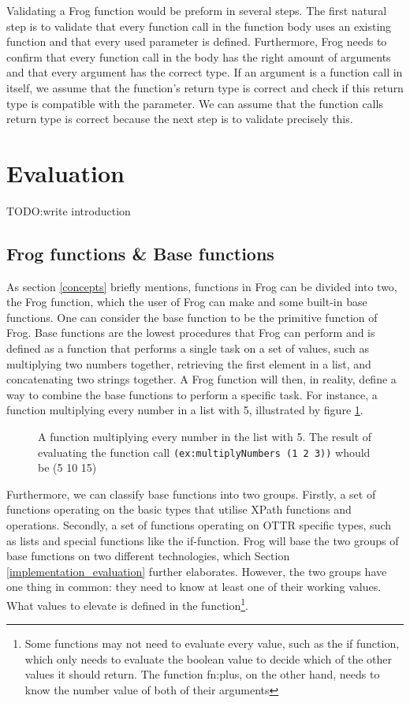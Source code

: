 \para
Validating a Frog function would be preform in several steps. The first natural step is to validate that every function call in the function body uses an existing function and that every used parameter is defined. Furthermore, Frog needs to confirm that every function call in the body has the right amount of arguments and that every argument has the correct type. If an argument is a function call in itself, we assume that the function's return type is correct and check if this return type is compatible with the parameter. We can assume that the function calls return type is correct because the next step is to validate precisely this. 

\section{Evaluation}
TODO:write introduction

\subsection{Frog functions \& Base functions}
As section \ref{concepts} briefly mentions, functions in Frog can be divided into two, the Frog function, which the user of Frog can make and some built-in base functions. One can consider the base function to be the primitive function of Frog. Base functions are the lowest procedures that Frog can perform and is defined as a function that performs a single task on a set of values, such as multiplying two numbers together, retrieving the first element in a list, and concatenating two strings together. A Frog function will then, in reality, define a way to combine the base functions to perform a specific task. For instance, a function multiplying every number in a list with 5, illustrated by figure \ref{fig:list_multiplication}. 

\begin{figure}
    
    \caption{A function multiplying every number in the list with 5. The result of evaluating the function call \lstinline{(ex:multiplyNumbers (1 2 3))} whould be (5 10 15)}
    \label{fig:list_multiplication}
\end{figure}


\para
Furthermore, we can classify base functions into two groups. Firstly, a set of functions operating on the basic types that utilise XPath functions and operations. Secondly, a set of functions operating on OTTR specific types, such as lists and special functions like the if-function. Frog will base the two groups of base functions on two different technologies, which Section \ref{implementation_evaluation} further elaborates. However, the two groups have one thing in common: they need to know at least one of their working values. What values to elevate is defined in the function\footnote{Some functions may not need to evaluate every value, such as the if function, which only needs to evaluate the boolean value to decide which of the other values it should return. The function fn:plus, on the other hand, needs to know the number value of both of their arguments}. 

